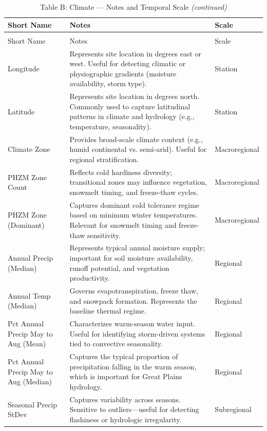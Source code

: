 \documentclass[
  10pt,
]{article}
\begin{document}
\begin{longtable}[t]{lp{8cm}l}
\caption{\label{tab:create_tables}Table B: Climate — Notes and Temporal Scale}\\
\toprule
Short Name & Notes & Scale\\
\midrule
\endfirsthead
\caption[]{Table B: Climate — Notes and Temporal Scale \textit{(continued)}}\\
\toprule
Short Name & Notes & Scale\\
\midrule
\endhead

\endfoot
\bottomrule
\endlastfoot
Longitude & Represents site location in degrees east or west. Useful for detecting
climatic or physiographic gradients (moisture availability, storm
type). & Station\\
Latitude & Represents site location in degrees north. Commonly used to capture
latitudinal patterns in climate and hydrology (e.g., temperature,
seasonality). & Station\\
Climate Zone & Provides broad-scale climate context (e.g., humid continental vs.
semi-arid). Useful for regional stratification. & Macroregional\\
PHZM Zone Count & Reflects cold hardiness diversity; transitional zones may influence
vegetation, snowmelt timing, and freeze-thaw cycles. & Macroregional\\
PHZM Zone (Dominant) & Captures dominant cold tolerance regime based on minimum winter
temperatures. Relevant for snowmelt timing and freeze-thaw
sensitivity. & Macroregional\\
\addlinespace
Annual Precip (Median) & Represents typical annual moisture supply; important for soil moisture
availability, runoff potential, and vegetation productivity. & Regional\\
Annual Temp (Median) & Governs evapotranspiration, freeze thaw, and snowpack formation.
Represents the baseline thermal regime. & Regional\\
Pct Annual Precip May to Aug (Mean) & Characterizes warm-season water input. Useful for identifying
storm-driven systems tied to convective seasonality. & Regional\\
Pct Annual Precip May to Aug (Median) & Captures the typical proportion of precipitation falling in the warm
season, which is important for Great Plains hydrology. & Regional\\
Seasonal Precip StDev & Captures variability across seasons. Sensitive to outliers—useful for
detecting flashiness or hydrologic irregularity. & Subregional\\

\end{longtable}
\end{document}
